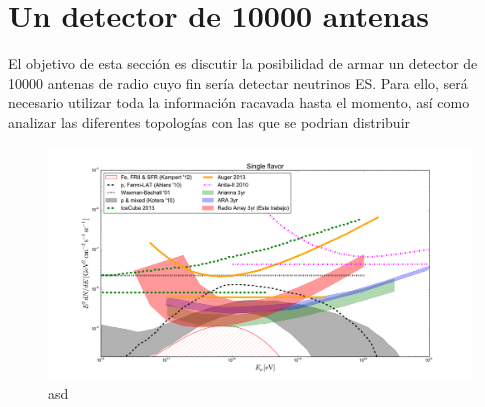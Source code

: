 	
\section{Un detector de 10000 antenas}

El objetivo de esta secci\'on es discutir la posibilidad de armar un detector de 10000 antenas de radio cuyo fin ser\'ia detectar neutrinos ES.
Para ello, ser\'a necesario utilizar toda la informaci\'on racavada hasta el momento, as\'i como analizar las diferentes topolog\'ias con las que se podrian distribuir 


	\begin{figure}[h!]
		\begin{center}
			\includegraphics[width=\textwidth]{fig/resultadosRadio/limits_future}
			\caption{asd}
			\label{fig:}
		\end{center}
	\end{figure}